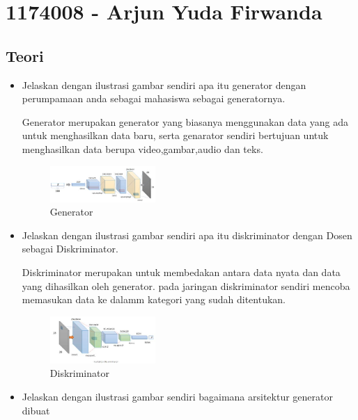 \section{1174008 - Arjun Yuda Firwanda}

\subsection{Teori}
\begin{enumerate}
\begin{itemize}

        \item Jelaskan dengan ilustrasi gambar sendiri apa itu generator dengan perumpamaan anda sebagai mahasiswa sebagai generatornya.

Generator merupakan generator yang biasanya menggunakan data yang ada untuk menghasilkan data baru, serta genarator sendiri bertujuan untuk menghasilkan data berupa video,gambar,audio dan teks.

	\begin{figure}[H]
            	\includegraphics[width=4cm]{figures/1174008/8/teori1.PNG}
           	 \centering
           	 \caption{Generator}
        	\end{figure}

        \item Jelaskan dengan ilustrasi gambar sendiri apa itu diskriminator dengan Dosen sebagai Diskriminator.

Diskriminator merupakan untuk membedakan antara data nyata dan data yang dihasilkan oleh generator. pada jaringan diskriminator sendiri mencoba memasukan data ke dalamm kategori yang sudah ditentukan.

	\begin{figure}[H]
		\includegraphics[width=4cm]{figures/1174008/8/teori2.PNG}
            	\centering
           	 \caption{Diskriminator}
       	 \end{figure}

        \item Jelaskan dengan ilustrasi gambar sendiri bagaimana arsitektur generator dibuat


\end{itemize}
\end{enumerate}
